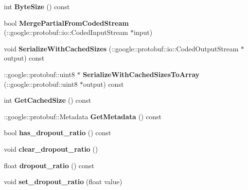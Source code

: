 \begin{DoxyCompactItemize}
int {\bfseries Byte\+Size} () const
\item 
\mbox{\label{classcaffe_1_1_dropout_parameter_ab81924462ff71971ceecfd3923b848f6}} 
bool {\bfseries Merge\+Partial\+From\+Coded\+Stream} (\+::google\+::protobuf\+::io\+::\+Coded\+Input\+Stream $\ast$input)
\item 
\mbox{\label{classcaffe_1_1_dropout_parameter_a6235a397b63d76c2fb83113bb7bf463c}} 
void {\bfseries Serialize\+With\+Cached\+Sizes} (\+::google\+::protobuf\+::io\+::\+Coded\+Output\+Stream $\ast$output) const
\item 
\mbox{\label{classcaffe_1_1_dropout_parameter_a67c0de355ad3f841ba1af000b2f1de7b}} 
\+::google\+::protobuf\+::uint8 $\ast$ {\bfseries Serialize\+With\+Cached\+Sizes\+To\+Array} (\+::google\+::protobuf\+::uint8 $\ast$output) const
\item 
\mbox{\label{classcaffe_1_1_dropout_parameter_ae2fdd2f6b9d7a5d371864bd0ec8db014}} 
int {\bfseries Get\+Cached\+Size} () const
\item 
\mbox{\label{classcaffe_1_1_dropout_parameter_af3f50f086a4f9ebc5d303f45cb807e72}} 
\+::google\+::protobuf\+::\+Metadata {\bfseries Get\+Metadata} () const
\item 
\mbox{\label{classcaffe_1_1_dropout_parameter_a3b46d99f2987c082a1d8e9c1042e360c}} 
bool {\bfseries has\+\_\+dropout\+\_\+ratio} () const
\item 
\mbox{\label{classcaffe_1_1_dropout_parameter_ad9609722d6e3589fb8285204e91aa828}} 
void {\bfseries clear\+\_\+dropout\+\_\+ratio} ()
\item 
\mbox{\label{classcaffe_1_1_dropout_parameter_aeb58e6f1cad89ae058c4d30f05253c82}} 
float {\bfseries dropout\+\_\+ratio} () const
\item 
\mbox{\label{classcaffe_1_1_dropout_parameter_ab03810ccf6de9f261d8240c107ab4318}} 
void {\bfseries set\+\_\+dropout\+\_\+ratio} (float value)
\end{DoxyCompactItemize}
